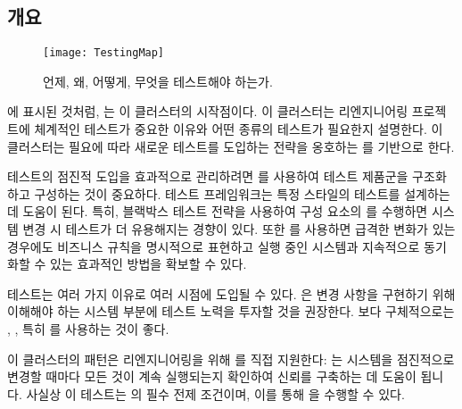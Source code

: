 \documentclass[a4paper,10pt,twoside]{book}
\begin{document}
\subsection*{개요}

\begin{figure}
\begin{center}
\texttt{[image: TestingMap]}
\caption{언제, 왜, 어떻게, 무엇을 테스트해야 하는가.}
\end{center}
\end{figure}

에 표시된 것처럼, 는 이 클러스터의 시작점이다. 이 클러스터는 리엔지니어링 프로젝트에 체계적인 테스트가 중요한 이유와 어떤 종류의 테스트가 필요한지 설명한다. 이 클러스터는 필요에 따라 새로운 테스트를 도입하는 전략을 옹호하는 를 기반으로 한다.

테스트의 점진적 도입을 효과적으로 관리하려면 를 사용하여 테스트 제품군을 구조화하고 구성하는 것이 중요하다. 테스트 프레임워크는 특정 스타일의 테스트를 설계하는 데 도움이 된다. 특히, 블랙박스 테스트 전략을 사용하여 구성 요소의 를 수행하면 시스템 변경 시 테스트가 더 유용해지는 경향이 있다. 또한 를 사용하면 급격한 변화가 있는 경우에도 비즈니스 규칙을 명시적으로 표현하고 실행 중인 시스템과 지속적으로 동기화할 수 있는 효과적인 방법을 확보할 수 있다.

테스트는 여러 가지 이유로 여러 시점에 도입될 수 있다. 은 변경 사항을 구현하기 위해 이해해야 하는 시스템 부분에 테스트 노력을 투자할 것을 권장한다. 보다 구체적으로는 , , 특히 를 사용하는 것이 좋다.

이 클러스터의 패턴은 리엔지니어링을 위해 를 직접 지원한다: 는 시스템을 점진적으로 변경할 때마다 모든 것이 계속 실행되는지 확인하여 신뢰를 구축하는 데 도움이 됩니다. 사실상 이 테스트는 의 필수 전제 조건이며, 이를 통해 을 수행할 수 있다.
\end{document}
